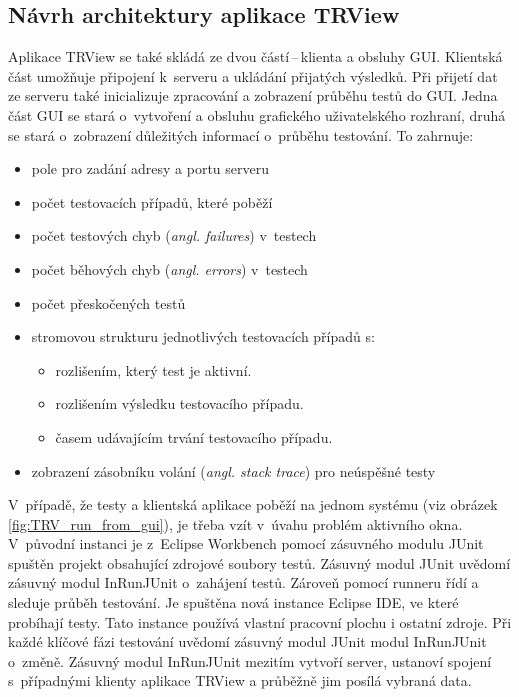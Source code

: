     \subsection{Návrh architektury aplikace TRView}
    Aplikace TRView se také skládá ze dvou částí\,--\,klienta a obsluhy GUI. Klientská část umožňuje připojení k~serveru a ukládání přijatých výsledků. Při přijetí dat ze serveru také inicializuje zpracování a zobrazení průběhu testů do GUI. Jedna část GUI se stará o~vytvoření a obsluhu grafického uživatelského rozhraní, druhá se stará o~zobrazení důležitých informací o~průběhu testování. To zahrnuje:
    \begin{itemize}
     \item pole pro zadání adresy a portu serveru
     \item počet testovacích případů, které poběží
     \item počet testových chyb (\emph{angl. failures}) v~testech
     \item počet běhových chyb (\emph{angl. errors}) v~testech
     \item počet přeskočených testů
     \item stromovou strukturu jednotlivých testovacích případů s:
     \begin{itemize}
      \item rozlišením, který test je aktivní.
      \item rozlišením výsledku testovacího případu.
      \item časem udávajícím trvání testovacího případu.
     \end{itemize}
     \item zobrazení zásobníku volání (\emph{angl. stack trace}) pro neúspěšné testy
    \end{itemize}

    \noindent
    V~případě, že testy a klientská aplikace poběží na jednom systému (viz obrázek \ref{fig:TRV_run_from_gui}), je třeba vzít v~úvahu problém aktivního okna. V~původní instanci je z~Eclipse Workbench pomocí zásuvného modulu JUnit spuštěn projekt obsahující zdrojové soubory testů. Zásuvný modul JUnit uvědomí zásuvný modul InRunJUnit o~zahájení testů. Zároveň pomocí runneru řídí a sleduje průběh testování. Je spuštěna nová instance Eclipse IDE, ve které probíhají testy. Tato instance používá vlastní pracovní plochu i ostatní zdroje. Při každé klíčové fázi testování uvědomí zásuvný modul JUnit modul InRunJUnit o~změně. Zásuvný modul InRunJUnit mezitím vytvoří server, ustanoví spojení s~případnými klienty aplikace TRView a průběžně jim posílá vybraná data.

